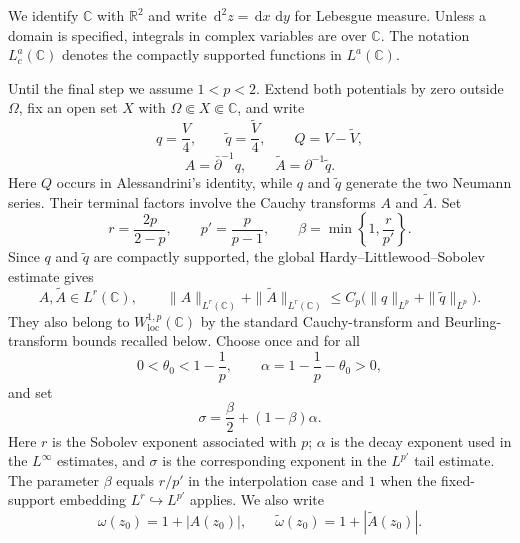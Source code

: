 \documentclass[a4paper,11pt]{article}
\newcommand{\R}{\mathbb{R}}
\newcommand{\C}{\mathbb{C}}
\newcommand{\dd}{\,\text{d}}
\theoremstyle{plain}
\theoremstyle{definition}
\theoremstyle{remark}
\begin{document}
We identify $\C$ with $\R^2$ and write $\dd^2z=\dd x\,\dd y$ for Lebesgue measure. Unless a domain is specified, integrals in complex variables are over $\C$. The notation $L^a_c(\C)$ denotes the compactly supported functions in $L^a(\C)$.

Until the final step we assume $1<p<2$.  Extend both potentials by zero outside $\Omega$, fix an open set $X$ with $\Omega\Subset X\Subset\C$, and write
\begin{equation}\label{Lp-q-notation}
        q=\frac V4,
        \qquad \widetilde q=\frac{\widetilde V}{4},
        \qquad Q=V-\widetilde V,
\end{equation}
\begin{equation*}
        A=\bar\partial^{-1}q,
        \qquad
        \widetilde A=\partial^{-1}\widetilde q.
\end{equation*}
Here $Q$ occurs in Alessandrini's identity, while $q$ and $\widetilde q$ generate the two Neumann series.  Their terminal factors involve the Cauchy transforms $A$ and $\widetilde A$.  Set
\begin{equation}\label{r-alpha-theta-sigma-def}
        r=\frac{2p}{2-p},
        \qquad
        p'=\frac{p}{p-1},
        \qquad
        \beta=\min\left\{1,\frac{r}{p'}\right\}.
\end{equation}
Since $q$ and $\widetilde q$ are compactly supported, the global Hardy--Littlewood--Sobolev estimate gives
\begin{equation}\label{global-cauchy-primitives}
        A,\widetilde A\in L^r(\C),
        \qquad
        \|A\|_{L^r(\C)}+\|\widetilde A\|_{L^r(\C)}
        \leq C_p\bigl(\|q\|_{L^p}+\|\widetilde q\|_{L^p}\bigr).
\end{equation}
They also belong to $W^{1,p}_{\mathrm{loc}}(\C)$ by the standard Cauchy-transform and Beurling-transform bounds recalled below.
Choose once and for all
\begin{equation}\label{section3-alpha-restated}
        0<\theta_0<1-\frac1p,
        \qquad
        \alpha=1-\frac1p-\theta_0>0,
\end{equation}
and set
\begin{equation}\label{sigma-def-general}
        \sigma=\frac{\beta}{2}+(1-\beta)\alpha.
\end{equation}
Here $r$ is the Sobolev exponent associated with $p$; $\alpha$ is the decay exponent used in the $L^\infty$ estimates, and $\sigma$ is the corresponding exponent in the $L^{p'}$ tail estimate. The parameter $\beta$ equals $r/p'$ in the interpolation case and $1$ when the fixed-support embedding $L^r\hookrightarrow L^{p'}$ applies.  We also write
\begin{equation}\label{tail-center-weights}
        \omega(z_0)=1+|A(z_0)|,
        \qquad
        \widetilde\omega(z_0)=1+|\widetilde A(z_0)|.
\end{equation}
\end{document}
